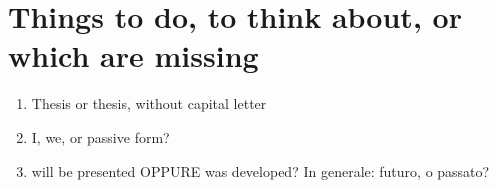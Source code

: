 
\chapter{Things to do, to think about, or which are missing}
\begin{enumerate}
\item Thesis or thesis, without capital letter
\item I, we, or passive form?
\item will be presented OPPURE was developed? In generale: futuro, o passato?
\end{enumerate}